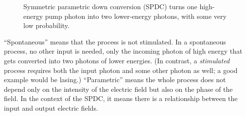 \begin{figure}[t]
    \centering
    \caption[Spontaneous parametric down conversion (SPDC)]{Symmetric parametric down conversion (SPDC) turns one high-energy pump photon into two lower-energy photons, with some very low probability.}
    \label{fig:spdc}
\end{figure}

``Spontaneous'' means that the process is not stimulated.
In a spontaneous process, no other input is needed, only the incoming photon of high energy that gets converted into two photons of lower energies.
(In contrast, a \emph{stimulated} process requires both the input photon and some other photon as well; a good example would be lasing.) “Parametric” means the whole process does not depend only on the intensity of the electric field but also on the phase of the field. In the context of the SPDC, it means there is a relationship between the input and output electric fields.

